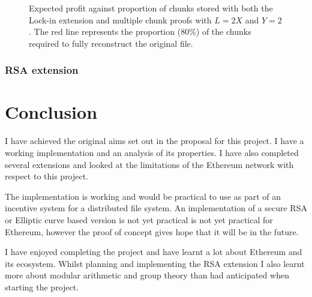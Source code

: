 \documentclass[12pt,a4paper,twoside,openright]{report}
\begin{document}
\begin{figure}[H]

\caption[Expected attacker profit: erasure code]{Expected profit against proportion of chunks stored with both the Lock-in extension and multiple chunk proofs with $L = 2X$ and $Y = 2$.
The red line represents the proportion (80\%) of the chunks required to fully reconstruct the original file.}
\label{eval-graph-erasure}
\end{figure}

\subsection{RSA extension}


\chapter{Conclusion}

I have achieved the original aims set out in the proposal for this project.
I have a working implementation and an analysis of its properties.
I have also completed several extensions and looked at the limitations of the Ethereum network with respect to this project.

The implementation is working and would be practical to use as part of an incentive system for a distributed file system.
An implementation of a secure RSA or Elliptic curve based version is not yet practical is not yet practical for Ethereum,
however the proof of concept gives hope that it will be in the future.

I have enjoyed completing the project and have learnt a lot about Ethereum and its ecosystem.
Whilst planning and implementing the RSA extension I also learnt more about modular arithmetic and group theory than had
anticipated when starting the project.
\end{document}
